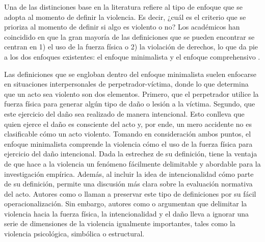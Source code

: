 \documentclass[12pt,twoside]{templates/facsothesis}
\begin{document}
Una de las distinciones base en la literatura refiere al tipo de enfoque que se adopta al momento de definir la violencia. Es decir, ¿cuál es el criterio que se prioriza al momento de definir si algo es violento o no? Los académicos han coincidido en que la gran mayoría de las definiciones que se pueden encontrar se centran en 1) el uso de la fuerza física o 2) la violación de derechos, lo que da pie a los dos enfoques existentes: el enfoque minimalista y el enfoque comprehensivo \citep{Bufacchi2005}.

Las definiciones que se engloban dentro del enfoque minimalista suelen enfocarse en situaciones interpersonales de perpetrador-víctima, donde lo que determina que un acto sea violento son dos elementos. Primero, que el perpetrador utilice la fuerza física para generar algún tipo de daño o lesión a la víctima. Segundo, que este ejercicio del daño sea realizado de manera intencional. Esto conlleva que quien ejerce el daño es consciente del acto y, por ende, un mero accidente no es clasificable cómo un acto violento. Tomando en consideración ambos puntos, el enfoque minimalista comprende la violencia cómo el uso de la fuerza física para ejercicio del daño intencional. Dada la estrechez de su definición, tiene la ventaja de que hace a la violencia un fenómeno fácilmente delimitable y abordable para la investigación empírica. Además, al incluir la idea de intencionalidad cómo parte de su definición, permite una discusión más clara sobre la evaluación normativa del acto. Autores como \citet{Keane2004} o \citet{Coady2008} llaman a preservar este tipo de definiciones por su fácil operacionalización. Sin embargo, autores como \citet{Galtung1969} o \citet{Bufacchi2007} argumentan que delimitar la violencia hacia la fuerza física, la intencionalidad y el daño lleva a ignorar una serie de dimensiones de la violencia igualmente importantes, tales como la violencia psicológica, simbólica o estructural.
\end{document}
